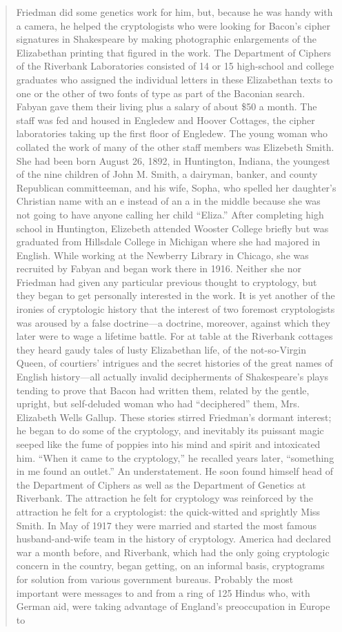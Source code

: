 \documentclass[12pt,a4paper]{article}
\begin{document}
\begin{quote}
\small
Friedman did some genetics work for him, but, because he was handy with a camera, he helped the cryptologists who were looking for Bacon's cipher signatures in Shakespeare by making photographic enlargements of the Elizabethan printing that figured in the work. The Department of Ciphers of the Riverbank Laboratories consisted of 14 or 15 high-school and college graduates who assigned the individual letters in these Elizabethan texts to one or the other of two fonts of type as part of the Baconian search. Fabyan gave them their living plus a salary of about \$50 a month. The staff was fed and housed in Engledew and Hoover Cottages, the cipher laboratories taking up the first floor of Engledew. The young woman who collated the work of many of the other staff members was Elizebeth Smith. She had been born August 26, 1892, in Huntington, Indiana, the youngest of the nine children of John M. Smith, a dairyman, banker, and county Republican committeeman, and his wife, Sopha, who spelled her daughter's Christian name with an e instead of an a in the middle because she was not going to have anyone calling her child ``Eliza.'' After completing high school in Huntington, Elizebeth attended Wooster College briefly but was graduated from Hillsdale College in Michigan where she had majored in English. While working at the Newberry Library in Chicago, she was recruited by Fabyan and began work there in 1916. Neither she nor Friedman had given any particular previous thought to cryptology, but they began to get personally interested in the work. It is yet another of the ironies of cryptologic history that the interest of two foremost cryptologists was aroused by a false doctrine---a doctrine, moreover, against which they later were to wage a lifetime battle. For at table at the Riverbank cottages they heard gaudy tales of lusty Elizabethan life, of the not-so-Virgin Queen, of courtiers' intrigues and the secret histories of the great names of English history---all actually invalid decipherments of Shakespeare's plays tending to prove that Bacon had written them, related by the gentle, upright, but self-deluded woman who had ``deciphered'' them, Mrs. Elizabeth Wells Gallup. These stories stirred Friedman's dormant interest; he began to do some of the cryptology, and inevitably its puissant magic seeped like the fume of poppies into his mind and spirit and intoxicated him. ``When it came to the cryptology,'' he recalled years later, ``something in me found an outlet.'' An understatement. He soon found himself head of the Department of Ciphers as well as the Department of Genetics at Riverbank. The attraction he felt for cryptology was reinforced by the attraction he felt for a cryptologist: the quick-witted and sprightly Miss Smith. In May of 1917 they were married and started the most famous husband-and-wife team in the history of cryptology. America had declared war a month before, and Riverbank, which had the only going cryptologic concern in the country, began getting, on an informal basis, cryptograms for solution from various government bureaus. Probably the most important were messages to and from a ring of 125 Hindus who, with German aid, were taking advantage of England's preoccupation in Europe to 
\end{quote}
\end{document}
